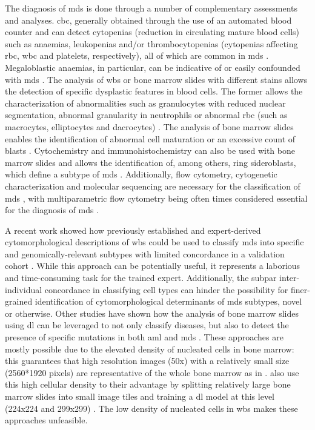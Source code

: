 The diagnosis of \ac{mds} is done through a number of complementary assessments and analyses. \Ac{cbc}, generally obtained through the use of an automated blood counter and can detect cytopenias (reduction in circulating mature blood cells) such as anaemias, leukopenias and/or thrombocytopenias (cytopenias affecting \ac{rbc}, \ac{wbc} and platelets, respectively), all of which are common in \ac{mds} \cite{Najean1989-qm,Campo2017-wi}. Megaloblastic anaemias, in particular, can be indicative of or easily confounded with \ac{mds} \cite{Kaferle2009-pl,Vasekova2016-vo,Corey2007-cs}. The analysis of \ac{wbs} or bone marrow slides with different stains allows the detection of specific dysplastic features in blood cells. The former allows the characterization of abnormalities such as granulocytes with reduced nuclear segmentation, abnormal granularity in neutrophils or abnormal \ac{rbc} (such as macrocytes, elliptocytes and dacrocytes) \cite{Campo2017-wi,Langenhuijsen1984-qx,Kuriyama1986-ts,Davey1988-zn}. The analysis of bone marrow slides enables the identification of abnormal cell maturation or an excessive count of blasts \cite{Aster2020-cu}. Cytochemistry and immunohistochemistry can also be used with bone marrow slides and allows the identification of, among others, ring sideroblasts, which define a subtype of \ac{mds} \cite{Campo2017-wi,Mufti2008-ye}. Additionally, flow cytometry, cytogenetic characterization and molecular sequencing are necessary for the classification of \ac{mds} \cite{Aster2020-cu,Porwit2014-zi,Greenberg2012-en}, with multiparametric flow cytometry being often times considered essential for the diagnosis of \ac{mds} \cite{Cremers2016-fs}.

A recent work showed how previously established and expert-derived cytomorphological descriptions of \ac{wbs} could be used to classify \ac{mds} into specific and genomically-relevant subtypes with limited concordance in a validation cohort \cite{Nagata2020-lh}. While this approach can be potentially useful, it represents a laborious and time-consuming task for the trained expert. Additionally, the subpar inter-individual concordance in classifying cell types can hinder the possibility for finer-grained identification of cytomorphological determinants of \ac{mds} subtypes, novel or otherwise. Other studies have shown how the analysis of bone marrow slides using \ac{dl} can be leveraged to not only classify diseases, but also to detect the presence of specific mutations in both \ac{aml} and \ac{mds} \cite{Bruck2021-fx,Eckardt2021-fb}. These approaches are mostly possible due to the elevated density of nucleated cells in bone marrow: this guarantees that high resolution images (50x) with a relatively small size (2560*1920 pixels) are representative of the whole bone marrow as in \cite{Eckardt2021-fb}.   also use this high cellular density to their advantage by splitting relatively large bone marrow slides into small image tiles and training a \ac{dl} model at this level (224x224 and 299x299) \cite{Bruck2021-fx}. The low density of nucleated cells in \ac{wbs} makes these approaches unfeasible.

